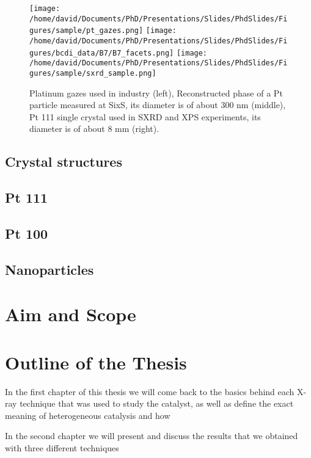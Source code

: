 \begin{figure}[!htb]
    \centering
    \texttt{[image: /home/david/Documents/PhD/Presentations/Slides/PhdSlides/Figures/sample/pt\_gazes.png]}
    \texttt{[image: /home/david/Documents/PhD/Presentations/Slides/PhdSlides/Figures/bcdi\_data/B7/B7\_facets.png]}
    \texttt{[image: /home/david/Documents/PhD/Presentations/Slides/PhdSlides/Figures/sample/sxrd\_sample.png]}
    \caption{Platinum gazes used in industry (left), Reconstructed phase of a Pt particle measured at SixS, its diameter is of about 300 nm (middle), Pt 111 single crystal used in SXRD and XPS experiments, its diameter is of about 8 mm (right).}
\end{figure}

\subsection{Crystal structures}

\subsection{Pt 111}

\subsection{Pt 100}

\subsection{Nanoparticles}

\section{Aim and Scope}

\section{Outline of the Thesis}

In the first chapter of this thesis we will come back to the basics behind each X-ray technique that was used to study the catalyst, as well as define the exact meaning of heterogeneous catalysis and how

In the second chapter we will present and discuss the results that we obtained with three different techniques
